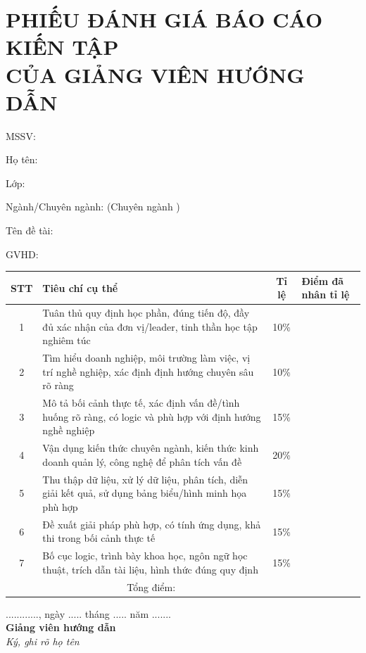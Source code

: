 \section*{PHIẾU ĐÁNH GIÁ BÁO CÁO KIẾN TẬP\\ CỦA GIẢNG VIÊN HƯỚNG DẪN}
{\setlength{\parskip}{0pt}\singlespacing
MSSV: \mssv

Họ tên: \svth

Lớp: \lop

Ngành/Chuyên ngành: \tennganh{} (Chuyên ngành \tenchuyennganh)

Tên đề tài: \tendetai

GVHD: \gvhd
\par}
\vspace{6pt}
{\singlespacing\renewcommand{\arraystretch}{1.3}\noindent
\begin{tabularx}{\textwidth}{|c|>{\centering\arraybackslash}X|c|>{\centering\arraybackslash}p{2.2cm}|}\hline
\textbf{STT} & \textbf{Tiêu chí cụ thể} & \textbf{Tỉ lệ} & \textbf{Điểm đã nhân tỉ lệ} \\ \hline
1 & Tuân thủ quy định học phần, đúng tiến độ, đầy đủ xác nhận của đơn vị/leader, tinh thần học tập nghiêm túc & 10\% & \\ \hline
2 & Tìm hiểu doanh nghiệp, môi trường làm việc, vị trí nghề nghiệp, xác định định hướng chuyên sâu rõ ràng & 10\% & \\ \hline
3 & Mô tả bối cảnh thực tế, xác định vấn đề/tình huống rõ ràng, có logic và phù hợp với định hướng nghề nghiệp & 15\% & \\ \hline
4 & Vận dụng kiến thức chuyên ngành, kiến thức kinh doanh quản lý, công nghệ để phân tích vấn đề & 20\% & \\ \hline
5 & Thu thập dữ liệu, xử lý dữ liệu, phân tích, diễn giải kết quả, sử dụng bảng biểu/hình minh họa phù hợp & 15\% & \\ \hline
6 & Đề xuất giải pháp phù hợp, có tính ứng dụng, khả thi trong bối cảnh thực tế & 15\% & \\ \hline
7 & Bố cục logic, trình bày khoa học, ngôn ngữ học thuật, trích dẫn tài liệu, hình thức đúng quy định & 15\% & \\ \hline
\multicolumn{3}{|c|}{Tổng điểm:} & \\[12pt] \hline
\end{tabularx}}

\vspace{6pt}
\hfill\begin{minipage}{8cm}\centering
............, ngày ..... tháng ..... năm .......\\
\textbf{Giảng viên hướng dẫn}\\
\textit{Ký, ghi rõ họ tên}
\end{minipage}

